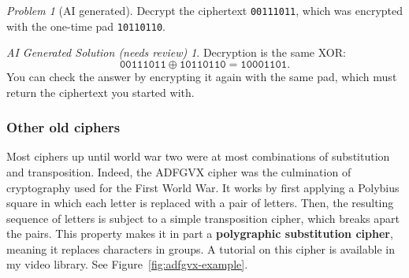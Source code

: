 \documentclass{article}
\theoremstyle{plain}
\theoremstyle{definition}
\theoremstyle{remark}
\newtheorem{problem}[theorem]{Problem}
\newtheorem*{aisolution}{AI Generated Solution (needs review)}
\numberwithin{theorem}{section}
\begin{document}
\begin{problem}[AI generated]
Decrypt the ciphertext \texttt{00111011}, which was encrypted with the one-time pad \texttt{10110110}.
\end{problem}
\begin{aisolution}
Decryption is the same XOR:
\[
	\texttt{00111011} \oplus \texttt{10110110} = \texttt{10001101}.
\]
You can check the answer by encrypting it again with the same pad, which must return the ciphertext you started with.
\end{aisolution}


\subsubsection{Other old ciphers}

Most ciphers up until world war two were at most combinations of substitution and transposition.  Indeed, the ADFGVX cipher was the culmination of cryptography used for the First World War.  It works by first applying a Polybius square in which each letter is replaced with a pair of letters.  Then, the resulting sequence of letters is subject to a simple transposition cipher, which breaks apart the pairs.  This property makes it in part a \textbf{polygraphic substitution cipher}, meaning it replaces characters in groups.  
A tutorial on this cipher is available in my video library.  See Figure~\ref{fig:adfgvx-example}.
\end{document}
